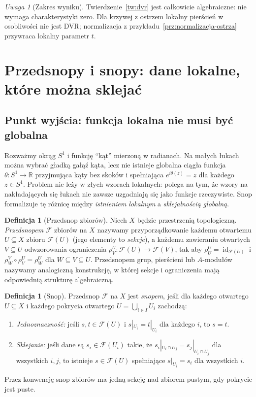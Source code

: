 \documentclass[11pt,a4paper,openany]{report}
\numberwithin{equation}{section}
\theoremstyle{plain}
\theoremstyle{definition}
\newtheorem{definicja}[twierdzenie]{Definicja}
\theoremstyle{remark}
\newtheorem{uwaga}[twierdzenie]{Uwaga}
\newcommand{\R}{\mathbb R}
\newcommand{\id}{\operatorname{id}}
\begin{document}
\begin{uwaga}[Zakres wyniku]
Twierdzenie~\ref{tw:dvr} jest całkowicie algebraiczne:
nie wymaga charakterystyki zero. Dla krzywej z ostrzem
lokalny pierścień w osobliwości nie jest DVR;
normalizacja z przykładu~\ref{prz:normalizacja-ostrza}
przywraca lokalny parametr $t$.
\end{uwaga}

\section{Przedsnopy i snopy: dane lokalne, które można sklejać}
\label{sec:snopy}

\subsection{Punkt wyjścia: funkcja lokalna nie musi być globalna}
Rozważmy okrąg $S^1$ i funkcję ``kąt'' mierzoną w radianach.
Na małych łukach można wybrać gładką gałąź kąta, lecz
nie istnieje globalna ciągła funkcja $\theta:S^1\to\R$
przyjmująca kąty bez skoków i spełniająca
$e^{i\theta(z)}=z$ dla każdego $z\in S^1$.
Problem nie leży w złych wzorach lokalnych: polega na tym,
że wzory na nakładających się łukach nie zawsze
uzgadniają się jako funkcje rzeczywiste. Snop formalizuje
tę różnicę między \emph{istnieniem lokalnym} a
\emph{sklejalnością globalną}.

\begin{definicja}[Przedsnop zbiorów]
Niech $X$ będzie przestrzenią topologiczną.
\emph{Przedsnopem} $\mathcal F$ zbiorów na $X$ nazywamy
przyporządkowanie każdemu otwartemu $U\subseteq X$
zbioru $\mathcal F(U)$ (jego elementy to \emph{sekcje}),
a każdemu zawieraniu otwartych $V\subseteq U$
odwzorowania ograniczenia
$\rho^U_V:\mathcal F(U)\to\mathcal F(V)$, tak aby
$\rho^U_U=\id_{\mathcal F(U)}$ i
$\rho^V_W\circ\rho^U_V=\rho^U_W$ dla $W\subseteq V\subseteq U$.
Przedsnopem grup, pierścieni lub $A$-modułów nazywamy
analogiczną konstrukcję, w której sekcje i ograniczenia
mają odpowiednią strukturę algebraiczną.
\end{definicja}

\begin{definicja}[Snop]
\label{def:snop}
Przedsnop $\mathcal F$ na $X$ jest \emph{snopem},
jeśli dla każdego otwartego $U\subseteq X$ i każdego
pokrycia otwartego $U=\bigcup_{i\in I}U_i$ zachodzą:
\begin{enumerate}[label=(S\arabic*)]
\item \emph{Jednoznaczność:} jeśli $s,t\in\mathcal F(U)$
i $s|_{U_i}=t|_{U_i}$ dla każdego $i$, to $s=t$.
\item \emph{Sklejanie:} jeśli dane są $s_i\in\mathcal F(U_i)$
takie, że $s_i|_{U_i\cap U_j}=s_j|_{U_i\cap U_j}$
dla wszystkich $i,j$, to istnieje $s\in\mathcal F(U)$
spełniające $s|_{U_i}=s_i$ dla wszystkich $i$.
\end{enumerate}
Przez konwencję snop zbiorów ma jedną sekcję nad
zbiorem pustym, gdy pokrycie jest puste.
\end{definicja}
\end{document}
